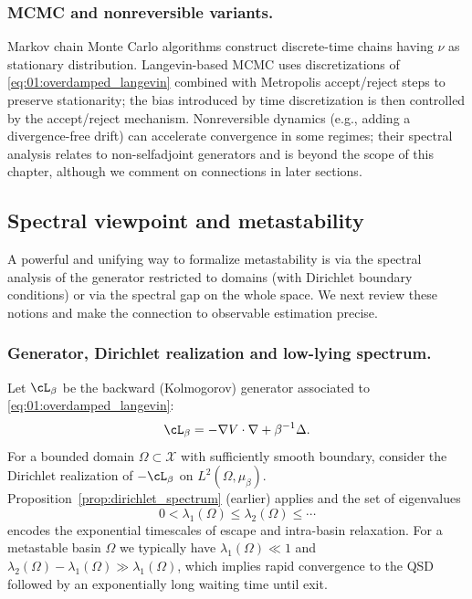 \subsubsection*{MCMC and nonreversible variants.}
Markov chain Monte Carlo algorithms construct discrete-time chains having $\nu$ as stationary distribution. Langevin-based MCMC uses discretizations
of \eqref{eq:01:overdamped_langevin} combined with Metropolis accept/reject steps to preserve stationarity; the bias introduced by time discretization
is then controlled by the accept/reject mechanism. Nonreversible dynamics (e.g., adding a divergence-free drift) can accelerate convergence in some regimes;
their spectral analysis relates to non-selfadjoint generators and is beyond the scope of this chapter, although we comment on connections in later sections.

\subsection{Spectral viewpoint and metastability}

A powerful and unifying way to formalize metastability is via the spectral analysis of the generator restricted to domains (with Dirichlet boundary conditions)
or via the spectral gap on the whole space. We next review these notions and make the connection to observable estimation precise.

\subsubsection*{Generator, Dirichlet realization and low-lying spectrum.}
Let $\cL_\beta$ be the backward (Kolmogorov) generator associated to \eqref{eq:01:overdamped_langevin}:
\begin{equation}\label{eq:01:generator}
    \cL_\beta = -\nabla V\cdot\nabla + \beta^{-1}\Delta.
\end{equation}
For a bounded domain $\Omega\subset\mathcal X$ with sufficiently smooth boundary, consider the Dirichlet realization of $-\cL_\beta$ on $L^2(\Omega,\mu_\beta)$.
Proposition~\ref{prop:dirichlet_spectrum} (earlier) applies and the set of eigenvalues
\[
0<\lambda_1(\Omega)\le\lambda_2(\Omega)\le\cdots
\]
encodes the exponential timescales of escape and intra-basin relaxation. For a metastable basin $\Omega$ we typically have $\lambda_1(\Omega)\ll 1$ and
$\lambda_2(\Omega)-\lambda_1(\Omega)\gg \lambda_1(\Omega)$, which implies rapid convergence to the QSD followed by an exponentially long waiting time
until exit.

